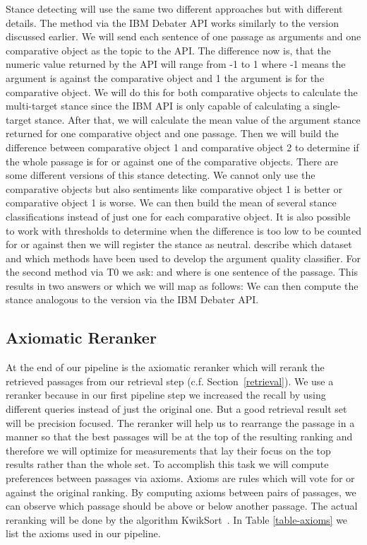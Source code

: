 Stance detecting will use the same two different approaches but with different details.
The method via the IBM Debater API works similarly to the version discussed earlier.
We will send each sentence of one passage as arguments and one comparative object as the topic to the API.
The difference now is, that the numeric value returned by the API will range from -1 to 1 where -1 means the argument is against the comparative object and 1 the argument is for the comparative object.
We will do this for both comparative objects to calculate the multi-target stance since the IBM API is only capable of calculating a single-target stance.
After that, we will calculate the mean value of the argument stance returned for one comparative object and one passage.
Then we will build the difference between comparative object 1 and comparative object 2 to determine if the whole passage is for or against one of the comparative objects.
There are some different versions of this stance detecting.
We cannot only use the comparative objects but also sentiments like comparative object 1 is better or comparative object 1 is worse.
We can then build the mean of several stance classifications instead of just one for each comparative object.
It is also possible to work with thresholds to determine when the difference is too low to be counted for or against then we will register the stance as neutral.
\citet{BarHaimBDSS2017} describe which dataset and which methods have been used to develop the argument quality classifier.
For the second method via T0 we ask:  and  where  is one sentence of the passage.
This results in two answers  or  which we will map as follows: 
We can then compute the stance analogous to the version via the IBM Debater API.

\subsection{Axiomatic Reranker}

At the end of our pipeline is the axiomatic reranker which will rerank the retrieved passages from our retrieval step (c.f. Section~\ref{retrieval}).
We use a reranker because in our first pipeline step we increased the recall by using different queries instead of just the original one.
But a good retrieval result set will be precision focused.
The reranker will help us to rearrange the passage in a manner so that the best passages will be at the top of the resulting ranking and therefore we will optimize for measurements that lay their focus on the top results rather than the whole set.
To accomplish this task we will compute preferences between passages via axioms.
Axioms are rules which will vote for or against the original ranking.
By computing axioms between pairs of passages, we can observe which passage should be above or below another passage.
The actual reranking will be done by the algorithm KwikSort~\cite{hagen:2016d}.
In Table \ref{table-axioms} we list the axioms used in our pipeline.

